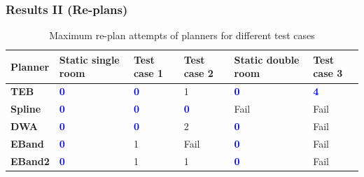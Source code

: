 \documentclass{beamer}
\begin{document}
\begin{frame}
    \frametitle{\huge{Results II (Re-plans)}}
    \begin{table}[H]
        \centering
        \begin{tabular}{p{1.5cm}p{1.3cm}p{1.3cm}p{1.3cm}p{1.3cm}p{1.3cm}}\toprule
            \textbf{Planner} & \textbf{Static single room} & \textbf{Test case 1} & \textbf{Test case 2} & \textbf{Static double room} & \textbf{Test case 3} \\\toprule
            \textbf{TEB    } & \textcolor{blue}{\textbf{0}} & \textcolor{blue}{\textbf{0}} & 1 & \textcolor{blue}{\textbf{0}} & \textcolor{blue}{\textbf{4}} \\\midrule
            \textbf{Spline } & \textcolor{blue}{\textbf{0}} & \textcolor{blue}{\textbf{0}} & \textcolor{blue}{\textbf{0}} & Fail & Fail \\\midrule
            \textbf{DWA    } & \textcolor{blue}{\textbf{0}} & \textcolor{blue}{\textbf{0}} & 2 & \textcolor{blue}{\textbf{0}} & Fail \\\midrule
            \textbf{EBand  } & \textcolor{blue}{\textbf{0}} & 1 & Fail & \textcolor{blue}{\textbf{0}} & Fail \\\midrule
            \textbf{EBand2 } & \textcolor{blue}{\textbf{0}} & 1 & 1 & \textcolor{blue}{\textbf{0}} & Fail \\
            \bottomrule
        \end{tabular}
        \caption{Maximum re-plan attempts of planners for different test cases}
    \end{table}
\end{frame}
\end{document}
